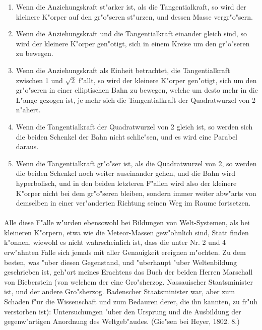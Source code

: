 \documentclass[a4paper, 11pt, oneside, polutonikogreek, german]{article}
\begin{document}
\begin{enumerate}
    \item Wenn die Anziehungskraft st"arker ist, als die Tangentialkraft, so wird der kleinere K"orper auf den gr"o"seren st"urzen, und dessen Masse vergr"o"sern.
    \item Wenn die Anziehungskraft und die Tangentialkraft einander gleich sind, so wird der kleinere K"orper gen"otigt, sich in einem Kreise um den gr"o"seren zu bewegen.
    \item Wenn die Anziehungskraft als Einheit betrachtet, die Tangentialkraft zwischen 1 und $\sqrt{2}$ f"allt, so wird der kleinere K"orper gen"otigt, sich um den gr"o"seren in einer elliptischen Bahn zu bewegen, welche um desto mehr in die L"ange gezogen ist, je mehr sich die Tangentialkraft der Quadratwurzel von 2 n"ahert.
    \item Wenn die Tangentialkraft der Quadratwurzel von 2 gleich ist, so werden sich die beiden Schenkel der Bahn nicht schlie"sen, und es wird eine Parabel daraus.
    \item Wenn die Tangentialkraft gr"o"ser ist, als die Quadratwurzel von 2, so werden die beiden Schenkel noch weiter auseinander gehen, und die Bahn wird hyperbolisch, und in den beiden letzteren F"allen wird also der kleinere K"orper nicht bei dem gr"o"seren bleiben, sondern immer weiter abw"arts von demselben in einer ver"anderten Richtung seinen Weg im Raume fortsetzen.
\end{enumerate}
\paragraph{}
Alle diese F"alle w"urden ebensowohl bei Bildungen von Welt-Systemen, als bei kleineren K"orpern, etwa wie die Meteor-Massen gew"ohnlich sind, Statt finden k"onnen, wiewohl es nicht wahrscheinlich ist, dass die unter Nr. 2 und 4 erw"ahnten Falle sich jemals mit aller Genauigkeit ereignen m"ochten. Zu dem besten, was "uber diesen Gegenstand, und "uberhaupt "uber Weltenbildung geschrieben ist, geh"ort meines Erachtens das Buch der beiden Herren Marschall von Bieberstein (von welchem der eine Gro"sherzog. Nassauischer Staatsminister ist, und der andere Gro"sherzog. Badenscher Staatsminister war, aber zum Schaden f"ur die Wissenschaft und zum Bedauren derer, die ihn kannten, zu fr"uh verstorben ist): Untersuchungen "uber den Ursprung und die Ausbildung der gegenw"artigen Anordnung des Weltgeb"audes. (Gie"sen bei Heyer, 1802. 8.)
\end{document}

